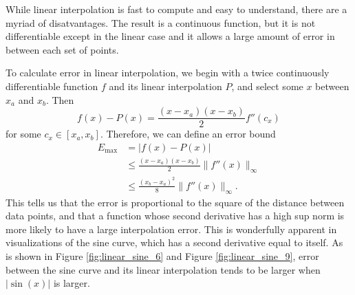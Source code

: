 \documentclass{article}
\begin{document}
While linear interpolation is fast to compute and easy to understand, there are a myriad of disatvantages. The result is a continuous function, but it is not differentiable except in the linear case and it allows a large amount of error in between each set of points.

To calculate error in linear interpolation, we begin with a twice continuously differentiable function $f$ and its linear interpolation $P$, and select some $x$ between $x_a$ and $x_b$. Then
\[
    f(x)-P(x) = \frac{(x-x_a)(x-x_b)}{2}f''(c_x)
\]
for some $c_x\in[x_a, x_b]$. Therefore, we can define an error bound
\begin{align*}
    E_{\max} & = |f(x)-P(x)|                                             \\
             & \leq \frac{(x-x_a)(x-x_b)}{2}\lVert f''(x)\rVert_{\infty} \\
             & \leq \frac{(x_b-x_a)^2}{8}\lVert f''(x)\rVert_{\infty}.
\end{align*}
This tells us that the error is proportional to the square of the distance between data points, and that a function whose second derivative has a high sup norm is more likely to have a large interpolation error. \cite{enwiki:interpolation}\cite{enwiki:linear_interpolation} This is wonderfully apparent in visualizations of the sine curve, which has a second derivative equal to itself. As is shown in Figure \ref{fig:linear_sine_6} and Figure \ref{fig:linear_sine_9}, error between the sine curve and its linear interpolation tends to be larger when $|\sin(x)|$ is larger.
\end{document}
